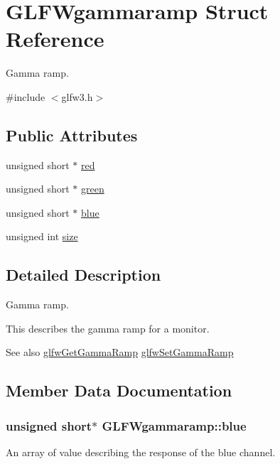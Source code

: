 \hypertarget{structGLFWgammaramp}{}\section{G\+L\+F\+Wgammaramp Struct Reference}
\label{structGLFWgammaramp}


Gamma ramp.  




{\ttfamily \#include $<$glfw3.\+h$>$}

\subsection*{Public Attributes}
\begin{DoxyCompactItemize}
\item 
unsigned short $\ast$ \hyperlink{structGLFWgammaramp_a2cce5d968734b685623eef913e635138}{red}
\item 
unsigned short $\ast$ \hyperlink{structGLFWgammaramp_affccc6f5df47820b6562d709da3a5a3a}{green}
\item 
unsigned short $\ast$ \hyperlink{structGLFWgammaramp_acf0c836d0efe29c392fe8d1a1042744b}{blue}
\item 
unsigned int \hyperlink{structGLFWgammaramp_ad620e1cffbff9a32c51bca46301b59a5}{size}
\end{DoxyCompactItemize}


\subsection{Detailed Description}
Gamma ramp. 

This describes the gamma ramp for a monitor.

\begin{DoxySeeAlso}{See also}
\hyperlink{group__monitor_gaeeac9198f3c91b83440eed679441f76b}{glfw\+Get\+Gamma\+Ramp} \hyperlink{group__monitor_gac9f36a1cfa10eab191d3029ea8bc9558}{glfw\+Set\+Gamma\+Ramp} 
\end{DoxySeeAlso}


\subsection{Member Data Documentation}
\hypertarget{structGLFWgammaramp_acf0c836d0efe29c392fe8d1a1042744b}{}
\subsubsection[{blue}]{\setlength{\rightskip}{0pt plus 5cm}unsigned short$\ast$ G\+L\+F\+Wgammaramp\+::blue}\label{structGLFWgammaramp_acf0c836d0efe29c392fe8d1a1042744b}
An array of value describing the response of the blue channel. \hypertarget{structGLFWgammaramp_affccc6f5df47820b6562d709da3a5a3a}{}
